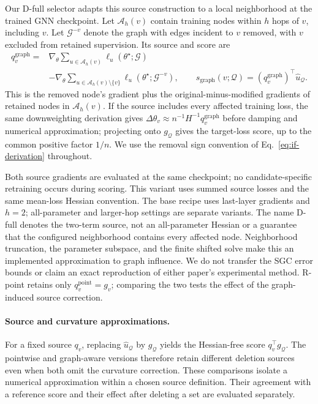 Our D-full selector adapts this source construction to a local neighborhood at the trained GNN checkpoint. Let $\mathcal A_h(v)$ contain training nodes within $h$ hops of $v$, including $v$. Let $\mathcal G^{-v}$ denote the graph with edges incident to $v$ removed, with $v$ excluded from retained supervision. Its source and score are
\begin{equation}
\begin{aligned}
q_v^{\mathrm{graph}}
={}&\nabla_\theta\sum_{u\in\mathcal A_h(v)}
\ell_u(\theta^\star;\mathcal G)\\
&-\nabla_\theta\sum_{u\in\mathcal A_h(v)\setminus\{v\}}
\ell_u(\theta^\star;\mathcal G^{-v}),
\qquad
s_{\mathrm{graph}}(v;\mathcal Q)
=(q_v^{\mathrm{graph}})^\top\widehat u_{\mathcal Q}.
\end{aligned}
\label{eq:if-graph-source}
\end{equation}
This is the removed node's gradient plus the original-minus-modified gradients of retained nodes in $\mathcal A_h(v)$. If the source includes every affected training loss, the same downweighting derivation gives $\Delta\theta_v\approx n^{-1}H^{-1}q_v^{\mathrm{graph}}$ before damping and numerical approximation; projecting onto $g_{\mathcal Q}$ gives the target-loss score, up to the common positive factor $1/n$. We use the removal sign convention of Eq.~\ref{eq:if-derivation} throughout.

Both source gradients are evaluated at the same checkpoint; no candidate-specific retraining occurs during scoring. This variant uses summed source losses and the same mean-loss Hessian convention. The base recipe uses last-layer gradients and $h=2$; all-parameter and larger-hop settings are separate variants. The name D-full denotes the two-term source, not an all-parameter Hessian or a guarantee that the configured neighborhood contains every affected node. Neighborhood truncation, the parameter subspace, and the finite shifted solve make this an implemented approximation to graph influence. We do not transfer the SGC error bounds or claim an exact reproduction of either paper's experimental method. R-point retains only $q_v^{\mathrm{point}}=g_v$; comparing the two tests the effect of the graph-induced source correction.

\paragraph{Source and curvature approximations.}
For a fixed source $q_v$, replacing $\widehat u_{\mathcal Q}$ by $g_{\mathcal Q}$ yields the Hessian-free score $q_v^\top g_{\mathcal Q}$. The pointwise and graph-aware versions therefore retain different deletion sources even when both omit the curvature correction. These comparisons isolate a numerical approximation within a chosen source definition. Their agreement with a reference score and their effect after deleting a set are evaluated separately.

